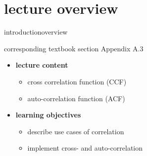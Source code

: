 


\subtitle{Module A.3: Fundamentals~---~Correlation}


	

    \section[overview]{lecture overview}
        \begin{frame}{introduction}{overview}
            \begin{block}{corresponding textbook section}
                    Appendix A.3
            \end{block}

            \begin{itemize}
                \item   \textbf{lecture content}
                    \begin{itemize}
                        \item   cross correlation function (CCF)
                        \item   auto-correlation function (ACF)
                    \end{itemize}
                \bigskip
                \item<2->   \textbf{learning objectives}
                    \begin{itemize}
                        \item   describe use cases of correlation
                        \item   implement cross- and auto-correlation
                    \end{itemize}
            \end{itemize}
        \end{frame}

